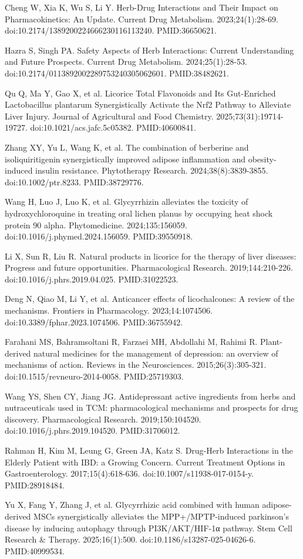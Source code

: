 \documentclass[11pt,oneside]{book}
\newcommand{\refend}{\endgroup\par}
\newcommand{\reff}[2]{\par\hangindent=7mm\hangafter=1\noindent[#1]\hspace{2mm}#2\par}
\begin{document}
\reff{44}{Cheng W, Xia K, Wu S, Li Y. Herb-Drug Interactions and Their Impact on Pharmacokinetics: An Update. Current Drug Metabolism. 2023;24(1):28-69. doi:10.2174/1389200224666230116113240. PMID:36650621.}
\reff{45}{Hazra S, Singh PA. Safety Aspects of Herb Interactions: Current Understanding and Future Prospects. Current Drug Metabolism. 2024;25(1):28-53. doi:10.2174/0113892002289753240305062601. PMID:38482621.}
\reff{46}{Qu Q, Ma Y, Gao X, et al. Licorice Total Flavonoids and Its Gut-Enriched Lactobacillus plantarum Synergistically Activate the Nrf2 Pathway to Alleviate Liver Injury. Journal of Agricultural and Food Chemistry. 2025;73(31):19714-19727. doi:10.1021/acs.jafc.5c05382. PMID:40600841.}
\reff{47}{Zhang XY, Yu L, Wang K, et al. The combination of berberine and isoliquiritigenin synergistically improved adipose inflammation and obesity-induced insulin resistance. Phytotherapy Research. 2024;38(8):3839-3855. doi:10.1002/ptr.8233. PMID:38729776.}
\reff{48}{Wang H, Luo J, Luo K, et al. Glycyrrhizin alleviates the toxicity of hydroxychloroquine in treating oral lichen planus by occupying heat shock protein 90 alpha. Phytomedicine. 2024;135:156059. doi:10.1016/j.phymed.2024.156059. PMID:39550918.}
\reff{49}{Li X, Sun R, Liu R. Natural products in licorice for the therapy of liver diseases: Progress and future opportunities. Pharmacological Research. 2019;144:210-226. doi:10.1016/j.phrs.2019.04.025. PMID:31022523.}
\reff{50}{Deng N, Qiao M, Li Y, et al. Anticancer effects of licochalcones: A review of the mechanisms. Frontiers in Pharmacology. 2023;14:1074506. doi:10.3389/fphar.2023.1074506. PMID:36755942.}
\reff{51}{Farahani MS, Bahramsoltani R, Farzaei MH, Abdollahi M, Rahimi R. Plant-derived natural medicines for the management of depression: an overview of mechanisms of action. Reviews in the Neurosciences. 2015;26(3):305-321. doi:10.1515/revneuro-2014-0058. PMID:25719303.}
\reff{52}{Wang YS, Shen CY, Jiang JG. Antidepressant active ingredients from herbs and nutraceuticals used in TCM: pharmacological mechanisms and prospects for drug discovery. Pharmacological Research. 2019;150:104520. doi:10.1016/j.phrs.2019.104520. PMID:31706012.}
\reff{53}{Rahman H, Kim M, Leung G, Green JA, Katz S. Drug-Herb Interactions in the Elderly Patient with IBD: a Growing Concern. Current Treatment Options in Gastroenterology. 2017;15(4):618-636. doi:10.1007/s11938-017-0154-y. PMID:28918484.}
\reff{54}{Yu X, Fang Y, Zhang J, et al. Glycyrrhizic acid combined with human adipose-derived MSCs synergistically alleviates the MPP+/MPTP-induced parkinson's disease by inducing autophagy through PI3K/AKT/HIF-1α pathway. Stem Cell Research \& Therapy. 2025;16(1):500. doi:10.1186/s13287-025-04626-6. PMID:40999534.}
\refend
\end{document}

